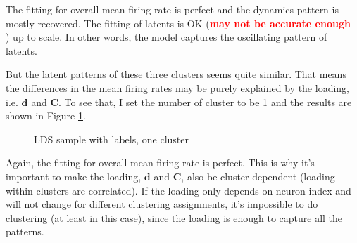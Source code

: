 \documentclass[]{article}
\begin{document}
The fitting for overall mean firing rate is perfect and the dynamics pattern is mostly recovered. The fitting of latents is OK (\textcolor{red}{\textbf{may not be accurate enough}}\\) up to scale. In other words, the model captures the oscillating pattern of latents.

But the latent patterns of these three clusters seems quite similar. That means the differences in the mean firing rates may be purely explained by the loading, i.e. \(\mathbf{d}\) and \(\mathbf{C}\). To see that, I set the number of cluster to be 1 and the results are shown in Figure \ref{fig:LDS labeled one cluster}.

\begin{figure}[h!]
	\caption{LDS sample with labels, one cluster}
	\label{fig:LDS labeled one cluster}
\end{figure}

Again, the fitting for overall mean firing rate is perfect. This is why it's important to make the loading, \(\mathbf{d}\) and \(\mathbf{C}\), also be cluster-dependent (loading within clusters are correlated). If the loading only depends on neuron index and will not change for different clustering assignments, it's impossible to do clustering (at least in this case), since the loading is enough to capture all the patterns.
\end{document}
